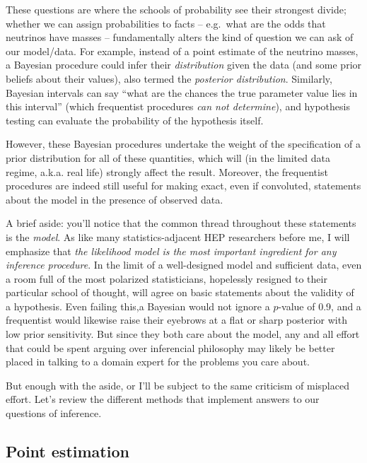 \documentclass[
  11pt,
  numbers=noendperiod]{book}
\begin{document}
These questions are where the schools of probability see their strongest
divide; whether we can assign probabilities to facts -- e.g.~what are
the odds that neutrinos have masses -- fundamentally alters the kind of
question we can ask of our model/data. For example, instead of a point
estimate of the neutrino masses, a Bayesian procedure could infer their
\emph{distribution} given the data (and some prior beliefs about their
values), also termed the \emph{posterior distribution}. Similarly,
Bayesian intervals can say ``what are the chances the true parameter
value lies in this interval'' (which frequentist procedures \emph{can
not determine}), and hypothesis testing can evaluate the probability of
the hypothesis itself.

However, these Bayesian procedures undertake the weight of the
specification of a prior distribution for all of these quantities, which
will (in the limited data regime, a.k.a. real life) strongly affect the
result. Moreover, the frequentist procedures are indeed still useful for
making exact, even if convoluted, statements about the model in the
presence of observed data.

A brief aside: you'll notice that the common thread throughout these
statements is the \emph{model}. As like many statistics-adjacent HEP
researchers before me, I will emphasize that \emph{the likelihood model
is the most important ingredient for any inference procedure}. In the
limit of a well-designed model and sufficient data, even a room full of
the most polarized statisticians, hopelessly resigned to their
particular school of thought, will agree on basic statements about the
validity of a hypothesis. Even failing this,a Bayesian would not ignore
a \(p\)-value of 0.9, and a frequentist would likewise raise their
eyebrows at a flat or sharp posterior with low prior sensitivity. But
since they both care about the model, any and all effort that could be
spent arguing over inferencial philosophy may likely be better placed in
talking to a domain expert for the problems you care about.

But enough with the aside, or I'll be subject to the same criticism of
misplaced effort. Let's review the different methods that implement
answers to our questions of inference.

\hypertarget{sec-mle}{%
\subsection{Point estimation}\label{sec-mle}}
\end{document}
